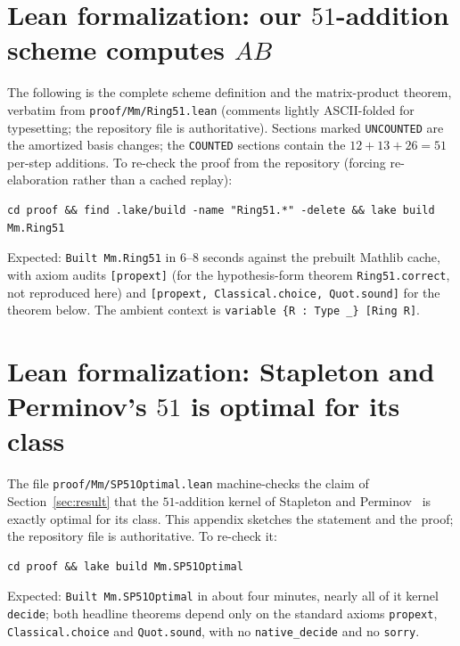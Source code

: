\documentclass[11pt]{article}
\theoremstyle{definition}
\theoremstyle{remark}
\begin{document}
\appendix

\section{Lean formalization: our $51$-addition scheme computes $AB$}\label{app:lean}

The following is the complete scheme definition and the
matrix-product theorem, verbatim from \texttt{proof/Mm/Ring51.lean}
(comments lightly ASCII-folded for typesetting; the repository file is
authoritative).  Sections marked \texttt{UNCOUNTED} are the amortized
basis changes; the \texttt{COUNTED} sections contain the
$12+13+26=51$ per-step additions.  To re-check the proof from the
repository (forcing re-elaboration rather than a cached replay):

\begin{verbatim}
cd proof && find .lake/build -name "Ring51.*" -delete && lake build Mm.Ring51
\end{verbatim}

\noindent
Expected: \texttt{Built Mm.Ring51} in 6--8 seconds against the
prebuilt Mathlib cache, with axiom audits
\texttt{[propext]} (for the hypothesis-form theorem
\texttt{Ring51.correct}, not reproduced here) and
\texttt{[propext, Classical.choice, Quot.sound]} for the theorem
below.  The ambient context is
\texttt{variable \{R : Type \_\} [Ring R]}.

{\footnotesize

}

\section{Lean formalization: Stapleton and Perminov's $51$ is optimal for its class}\label{app:optimal}

The file \texttt{proof/Mm/SP51Optimal.lean} machine-checks the claim of
Section~\ref{sec:result} that the $51$-addition kernel of
Stapleton and Perminov~\cite{SP26} is exactly optimal for its class.
This appendix sketches the statement and the proof; the repository file
is authoritative.  To re-check it:

\begin{verbatim}
cd proof && lake build Mm.SP51Optimal
\end{verbatim}

\noindent
Expected: \texttt{Built Mm.SP51Optimal} in about four minutes, nearly
all of it kernel \texttt{decide}; both headline theorems depend only on
the standard axioms \texttt{propext}, \texttt{Classical.choice} and
\texttt{Quot.sound}, with no \texttt{native\_decide} and no
\texttt{sorry}.
\end{document}
